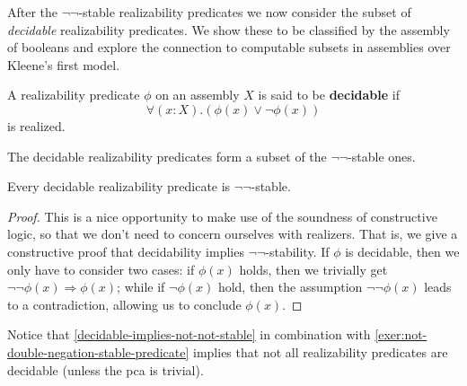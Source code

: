 After the \(\lnot\lnot\)-stable realizability predicates we now consider the
subset of \emph{decidable} realizability predicates. We show these to be
classified by the assembly of booleans and explore the connection to computable
subsets in assemblies over Kleene's first model.

\begin{definition}[Decidability]
  A realizability predicate \(\phi\) on an assembly \(X\) is said to be
  \textbf{decidable} if
  \[
    \forall(x : X).(\phi(x) \lor \lnot\phi(x))
  \]
  is realized.
\end{definition}

The decidable realizability predicates form a subset of the \(\lnot\lnot\)-stable ones.

\begin{lemma}\label{decidable-implies-not-not-stable}
  Every decidable realizability predicate is \(\lnot\lnot\)-stable.
\end{lemma}
\begin{proof}
  This is a nice opportunity to make use of the soundness of constructive logic,
  so that we don't need to concern ourselves with realizers.
  That is, we give a constructive proof that decidability implies
  \(\lnot\lnot\)-stability.
  If \(\phi\) is decidable, then we only have to consider two cases: if
  \(\phi(x)\) holds, then we trivially get
  \(\lnot\lnot\phi(x) \Rightarrow \phi(x)\); while if \(\lnot\phi(x)\) hold,
  then the assumption \(\lnot\lnot\phi(x)\) leads to a contradiction, allowing
  us to conclude \(\phi(x)\).
\end{proof}

Notice that \cref{decidable-implies-not-not-stable} in combination with
\cref{exer:not-double-negation-stable-predicate} implies that not all
realizability predicates are decidable (unless the pca is trivial).

